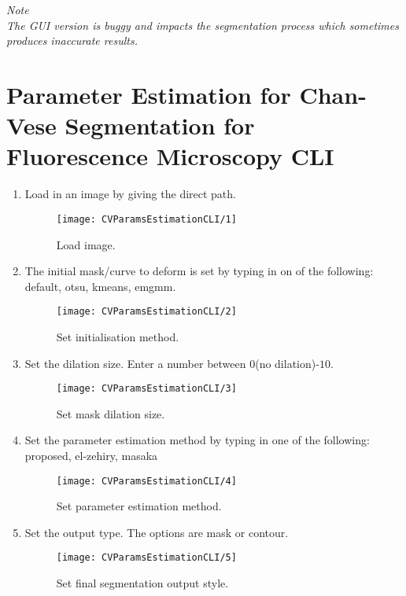 \documentclass[
11pt, %
a4paper, %
oneside, %
headinclude,footinclude, %
BCOR5mm, %
]{scrartcl}
\begin{document}
\textit{Note}\\
\textit{The GUI version is buggy and impacts the segmentation process which sometimes produces inaccurate results.}

\clearpage
\section{Parameter Estimation for Chan-Vese Segmentation for Fluorescence Microscopy CLI}
\begin{enumerate}
\item Load in an image by giving the direct path.
\begin{figure}[h]
	\centering
	\texttt{[image: CVParamsEstimationCLI/1]}
	\caption{Load image.}
\end{figure}

\item The initial mask/curve to deform is set by typing in on of the following: \textsf{default, otsu, kmeans, emgmm}.
\begin{figure}[h]
	\centering
	\texttt{[image: CVParamsEstimationCLI/2]}
	\caption{Set initialisation method.}
\end{figure}

\item Set the dilation size. Enter a number between $0$(no dilation)-$10$.
\begin{figure}[h]
	\centering
	\texttt{[image: CVParamsEstimationCLI/3]}
	\caption{Set mask dilation size.}
\end{figure}

\newpage
\item Set the parameter estimation method by typing in one of the following: \textsf{proposed, el-zehiry, masaka}
\begin{figure}[h]
	\centering
	\texttt{[image: CVParamsEstimationCLI/4]}
	\caption{Set parameter estimation method.}
\end{figure}

\item Set the output type. The options are \textsf{mask} or \textsf{contour}.
\begin{figure}[h]
	\centering
	\texttt{[image: CVParamsEstimationCLI/5]}
	\caption{Set final segmentation output style.}
\end{figure}


\end{enumerate}
\end{document}
